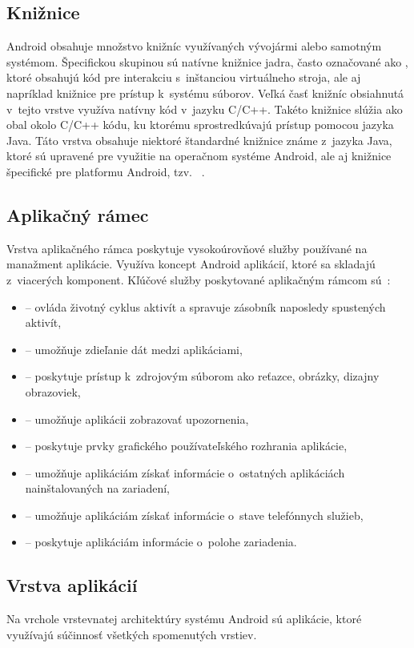 \subsection{Knižnice}
Android obsahuje množstvo knižníc využívaných vývojármi alebo samotným systémom. Špecifickou skupinou sú natívne knižnice jadra, často označované ako , ktoré obsahujú kód pre interakciu s~inštanciou virtuálneho stroja, ale aj napríklad knižnice pre prístup k~systému súborov. Veľká časť knižníc obsiahnutá v~tejto vrstve využíva natívny kód v~jazyku C/C++. Takéto knižnice slúžia ako obal okolo C/C++ kódu, ku ktorému  sprostredkúvajú prístup pomocou jazyka Java. Táto vrstva obsahuje niektoré štandardné knižnice známe z~jazyka Java, ktoré sú upravené pre využitie na operačnom systéme Android, ale aj knižnice špecifické pre platformu Android, tzv. ~\cite{Hashimi2009}.
\subsection{Aplikačný rámec}
Vrstva aplikačného rámca poskytuje vysokoúrovňové služby používané na manažment aplikácie. Využíva koncept Android aplikácií, ktoré sa skladajú z~viacerých komponent. Kľúčové služby poskytované aplikačným rámcom sú~\cite{architecture}: 
\begin{itemize}
	\item {}  --  ovláda životný cyklus aktivít a spravuje zásobník naposledy spustených aktivít,
	\item {}  --  umožňuje zdieľanie dát medzi aplikáciami,
	\item {}  --  poskytuje prístup k~zdrojovým súborom ako reťazce, obrázky, dizajny obrazoviek,
	\item {}  --  umožňuje aplikácii zobrazovať upozornenia,
	\item {}  --  poskytuje prvky grafického používateľského rozhrania aplikácie,
	\item {}  --  umožňuje aplikáciám získať informácie o~ostatných aplikáciách nainštalovaných na zariadení,
	\item {}  --  umožňuje aplikáciám získať informácie o~stave telefónnych služieb,
	\item {}  --  poskytuje aplikáciám informácie o~polohe zariadenia.
\end{itemize}
\subsection{Vrstva aplikácií}
Na vrchole vrstevnatej architektúry systému Android sú aplikácie, ktoré využívajú súčinnosť všetkých spomenutých vrstiev. 

